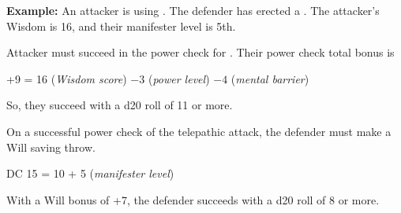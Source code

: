 
\textbf{Example:} An attacker is using . The defender has erected a . The attacker's Wisdom is 16, and their manifester level is 5th.
\begin{enumerate*}
	\item Attacker must succeed in the power check for . Their power check total bonus is

	\begin{Formula}{+9 = 16 (\textit{Wisdom score}) $-3$ (\textit{power level}) $-4$ (\textit{mental barrier})}\end{Formula}

	So, they succeed with a d20 roll of 11 or more.


	\item On a successful power check of the telepathic attack, the defender must make a Will saving throw.

	\begin{Formula}{DC 15 = 10 + 5 (\textit{manifester level})}\end{Formula}

	With a Will bonus of +7, the defender succeeds with a d20 roll of 8 or more.
\end{enumerate*}

